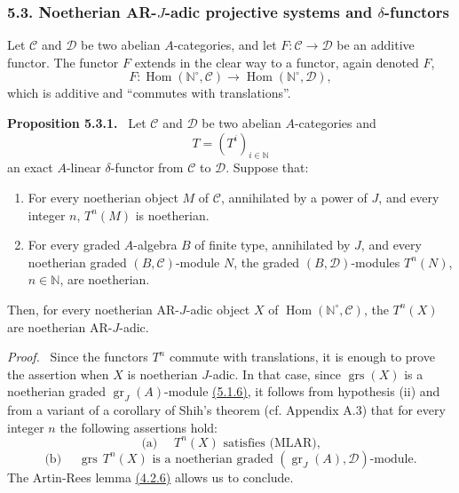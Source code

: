 \documentclass[11pt]{article}
\newenvironment{statement}[1]{\par\medskip\noindent\textbf{#1.}\ }{\par\medskip}
\newenvironment{prooftext}[1][Proof]{\par\noindent\emph{#1.}\ }{\par\medskip}
\DeclareMathOperator{\Hom}{Hom}
\providecommand{\gr}{\operatorname{gr}}
\providecommand{\Hom}{\operatorname{Hom}}
\providecommand{\gr}{\operatorname{gr}}
\providecommand{\gr}{\operatorname{gr}}
\providecommand{\grs}{\operatorname{grs}}
\providecommand{\Hom}{\operatorname{Hom}}
\begin{document}
\subsubsection*{5.3. Noetherian AR-\(J\)-adic projective systems and \(\delta\)-functors}\label{sga5:V:subsubsection:5.3}

Let \(\mathcal C\) and \(\mathcal D\) be two abelian \(A\)-categories, and let \(F:\mathcal C\to\mathcal D\) be an additive functor. The functor \(F\) extends in the clear way to a functor, again denoted \(F\),
\[
F:\Hom(\mathbb N^\circ,\mathcal C)\longrightarrow\Hom(\mathbb N^\circ,\mathcal D),
\]
which is additive and “commutes with translations”.

\label{sga5:V:proposition:5.3.1}\begin{statement}{Proposition 5.3.1}
Let \(\mathcal C\) and \(\mathcal D\) be two abelian \(A\)-categories and
\[
T=(T^i)_{i\in\mathbb N}
\]
an exact \(A\)-linear \(\delta\)-functor from \(\mathcal C\) to \(\mathcal D\). Suppose that:
\begin{enumerate}[label=\textup{(\roman*)}]
\item For every noetherian object \(M\) of \(\mathcal C\), annihilated by a power of \(J\), and every integer \(n\), \(T^n(M)\) is noetherian.
\item For every graded \(A\)-algebra \(B\) of finite type, annihilated by \(J\), and every noetherian graded \((B,\mathcal C)\)-module \(N\), the graded \((B,\mathcal D)\)-modules \(T^n(N)\), \(n\in\mathbb N\), are noetherian.
\end{enumerate}
Then, for every noetherian AR-\(J\)-adic object \(X\) of \(\Hom(\mathbb N^\circ,\mathcal C)\), the \(T^n(X)\) are noetherian AR-\(J\)-adic.
\end{statement}

\begin{prooftext}
Since the functors \(T^n\) commute with translations, it is enough to prove the assertion when \(X\) is noetherian \(J\)-adic. In that case, since \(\grs(X)\) is a noetherian graded \(\gr_J(A)\)-module \hyperref[sga5:V:proposition:5.1.6]{(5.1.6)}, it follows from hypothesis (ii) and from a variant of a corollary of Shih's theorem (cf. Appendix A.3) that for every integer \(n\) the following assertions hold:
\[
\text{(a) }\quad T^n(X)\text{ satisfies (MLAR),}
\]
\[
\text{(b) }\quad \grs\,T^n(X)\text{ is a noetherian graded }(\gr_J(A),\mathcal D)\text{-module.}
\]
The Artin-Rees lemma \hyperref[sga5:V:theorem:4.2.6]{(4.2.6)} allows us to conclude.
\end{prooftext}
\end{document}
